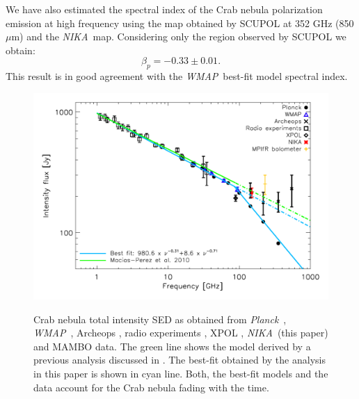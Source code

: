 \documentclass[twocolumn,traditabstract]{aa}
\def\NIKA{\textit{NIKA}}
\def\Planck{\textit{Planck}}
\def\WMAP{\textit{WMAP}}
\begin{document}
We have also estimated the spectral index of the Crab nebula polarization
emission at high frequency using the map obtained by SCUPOL at 352 GHz (850
$\mu$m) and the \NIKA\ map. Considering only the region observed by SCUPOL we
obtain:
\begin{equation}
\beta_p = -0.33 \pm 0.01.
\end{equation}
This result is in good agreement with the \WMAP\ best-fit model spectral index.

\begin{figure}
  \centering
          { \includegraphics[width=1\linewidth,keepaspectratio]{figures/Crab_SED_i_150.pdf}}
           \caption{Crab nebula total intensity SED as obtained from \Planck\ \citep{2015arXiv150702058P}, \WMAP\ \citep{2011ApJS..192...19W}, Archeops \citep{macias2007archeops}, radio experiments \citep{dmitrenko1970absolute, 1971IzVUZ..14..157V}, XPOL \citep{aumont2010}, \NIKA\ (this paper) and MAMBO \citep{2002A&A...386.1044B} data. The green line shows the model derived by a previous analysis discussed in \citep{macias2010}. The best-fit obtained by the analysis in this paper is shown in cyan line. Both, the best-fit models and the data account for the Crab nebula fading with the time.}
\label{crab_SED}		
  \end{figure} 
\end{document}
